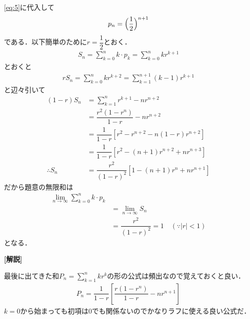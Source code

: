 \documentclass[../../main.tex]{subfiles}
\begin{document}
\cref{eq:5}に代入して
\begin{align}
  p_n = \Bigl(\dfrac{1}{2}\Bigr)^{n+1} \label{eq:7}
\end{align}
である．以下簡単のために$r = \dfrac{1}{2}$とおく．
\begin{align}
  S_n = \sum_{k=0}^n k \cdot p_k = \sum_{k=0}^n kr^{k+1}
\end{align}
とおくと
\begin{align}
  rS_n = \sum_{k=0}^{n} kr^{k+2} = \sum_{k=1}^{n+1} (k-1)r^{k+1}
\end{align}
と辺々引いて
\begin{align}
  (1-r)S_n
  & = \sum_{k=1}^{n}r^{k+1} - nr^{n+2} \\
  & = \dfrac{r^2(1-r^{n})}{1-r} - nr^{n+2} \\
  & = \dfrac{1}{1-r}\left[r^2-r^{n+2}-n(1-r)r^{n+2}\right] \\
  & = \dfrac{1}{1-r}\left[r^2-(n+1)r^{n+2} +nr^{n+3} \right] \\
  \therefore
  S_n
  & = \dfrac{r^2}{(1-r)^2}\left[1-(n+1)r^{n}+nr^{n+1}\right]
\end{align}
だから題意の無限和は
\begin{align}
  \lim_{n\to\infty}\sum_{k=0}^n k \cdot p_k \\
  &=\lim_{n\to\infty} S_n \\
  &= \dfrac{r^2}{(1-r)^2} = 1 \quad (\because |r| < 1)
\end{align}
となる．

{\bf [解説]}

最後に出てきた和$P_n=\sum_{k=1}^{n}kr^k$の形の公式は頻出なので覚えておくと良い．
\begin{align}
  P_n = \dfrac{1}{1-r}\left[\dfrac{r(1-r^{n})}{1-r} - nr^{n+1}\right]
\end{align}
$k=0$から始まっても初項は$0$でも関係ないのでかなりラフに使える良い公式だ．

\newpage
\end{document}
